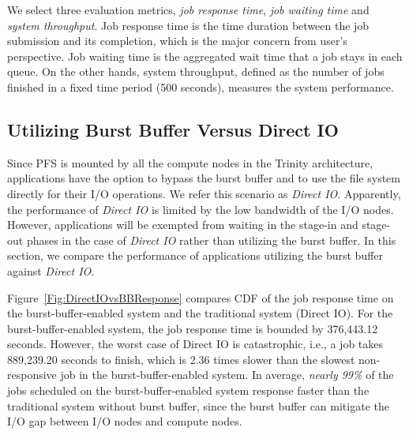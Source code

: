 We select three evaluation metrics, \textit{job response time}, \textit{job waiting time} and \textit{system throughput}.
Job response time is the time duration between the job submission and its completion,
which is the major concern from user's perspective. 
Job waiting time is the aggregated wait time that a job stays in each queue.
On the other hands, system throughput, defined as the number of jobs finished in
a fixed time period (500 seconds), measures the system performance.


\subsection{Utilizing Burst Buffer Versus Direct IO}
\label{Sec:Sim:DirectIOvsBB}



Since PFS is mounted by all the compute nodes in the Trinity architecture, 
applications have the option to bypass the burst buffer 
and to use the file system directly for their I/O operations.
We refer this scenario as \textit{Direct IO}. 
Apparently, the performance of \textit{Direct IO}
is limited by the low bandwidth of the I/O nodes. 
However, applications will be exempted from
waiting in the stage-in and stage-out phases in 
the case of \textit{Direct IO} rather than utilizing the burst buffer.
In this section, we compare the performance of applications utilizing the burst buffer
against \textit{Direct IO}.



Figure~\ref{Fig:DirectIOvsBBResponse} compares CDF of the job response
time on the burst-buffer-enabled system and the traditional system (Direct IO).
For the burst-buffer-enabled system, the job response time is bounded by 376,443.12 seconds.
However, the worst case of Direct IO is catastrophic, i.e., a job takes 889,239.20 seconds to finish, which is 2.36 times slower than the slowest non-responsive job
in the burst-buffer-enabled system.
In average, \textit{nearly 99\%} of the jobs scheduled on the burst-buffer-enabled system
response faster than the traditional system without burst buffer, since the burst buffer can mitigate the I/O gap between I/O nodes and compute nodes.


